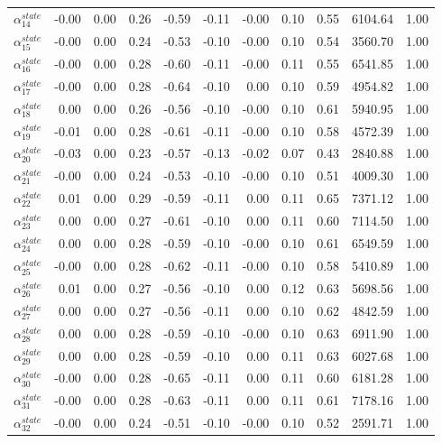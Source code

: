 \documentclass[12pt,english,a4paper]{article}
\begin{document}
\begin{table}[ht]
\begin{tabular}{rrrrrrrrrrr}
  $\alpha_{14}^{state}$ & -0.00 & 0.00 & 0.26 & -0.59 & -0.11 & -0.00 & 0.10 & 0.55 & 6104.64 & 1.00 \\ 
  $\alpha_{15}^{state}$ & -0.00 & 0.00 & 0.24 & -0.53 & -0.10 & -0.00 & 0.10 & 0.54 & 3560.70 & 1.00 \\ 
  $\alpha_{16}^{state}$ & -0.00 & 0.00 & 0.28 & -0.60 & -0.11 & -0.00 & 0.11 & 0.55 & 6541.85 & 1.00 \\ 
  $\alpha_{17}^{state}$ & -0.00 & 0.00 & 0.28 & -0.64 & -0.10 & 0.00 & 0.10 & 0.59 & 4954.82 & 1.00 \\ 
  $\alpha_{18}^{state}$ & 0.00 & 0.00 & 0.26 & -0.56 & -0.10 & -0.00 & 0.10 & 0.61 & 5940.95 & 1.00 \\ 
  $\alpha_{19}^{state}$ & -0.01 & 0.00 & 0.28 & -0.61 & -0.11 & -0.00 & 0.10 & 0.58 & 4572.39 & 1.00 \\ 
  $\alpha_{20}^{state}$ & -0.03 & 0.00 & 0.23 & -0.57 & -0.13 & -0.02 & 0.07 & 0.43 & 2840.88 & 1.00 \\ 
  $\alpha_{21}^{state}$ & -0.00 & 0.00 & 0.24 & -0.53 & -0.10 & -0.00 & 0.10 & 0.51 & 4009.30 & 1.00 \\ 
  $\alpha_{22}^{state}$ & 0.01 & 0.00 & 0.29 & -0.59 & -0.11 & 0.00 & 0.11 & 0.65 & 7371.12 & 1.00 \\ 
  $\alpha_{23}^{state}$ & 0.00 & 0.00 & 0.27 & -0.61 & -0.10 & 0.00 & 0.11 & 0.60 & 7114.50 & 1.00 \\ 
  $\alpha_{24}^{state}$ & 0.00 & 0.00 & 0.28 & -0.59 & -0.10 & -0.00 & 0.10 & 0.61 & 6549.59 & 1.00 \\ 
  $\alpha_{25}^{state}$ & -0.00 & 0.00 & 0.28 & -0.62 & -0.11 & -0.00 & 0.10 & 0.58 & 5410.89 & 1.00 \\ 
  $\alpha_{26}^{state}$ & 0.01 & 0.00 & 0.27 & -0.56 & -0.10 & 0.00 & 0.12 & 0.63 & 5698.56 & 1.00 \\ 
  $\alpha_{27}^{state}$ & 0.00 & 0.00 & 0.27 & -0.56 & -0.11 & 0.00 & 0.10 & 0.62 & 4842.59 & 1.00 \\ 
  $\alpha_{28}^{state}$ & 0.00 & 0.00 & 0.28 & -0.59 & -0.10 & -0.00 & 0.10 & 0.63 & 6911.90 & 1.00 \\ 
  $\alpha_{29}^{state}$ & 0.00 & 0.00 & 0.28 & -0.59 & -0.10 & 0.00 & 0.11 & 0.63 & 6027.68 & 1.00 \\ 
  $\alpha_{30}^{state}$ & -0.00 & 0.00 & 0.28 & -0.65 & -0.11 & 0.00 & 0.11 & 0.60 & 6181.28 & 1.00 \\ 
  $\alpha_{31}^{state}$ & -0.00 & 0.00 & 0.28 & -0.63 & -0.11 & 0.00 & 0.11 & 0.61 & 7178.16 & 1.00 \\ 
  $\alpha_{32}^{state}$ & -0.00 & 0.00 & 0.24 & -0.51 & -0.10 & -0.00 & 0.10 & 0.52 & 2591.71 & 1.00 \\ 

\end{tabular}
\end{table}
\end{document}
